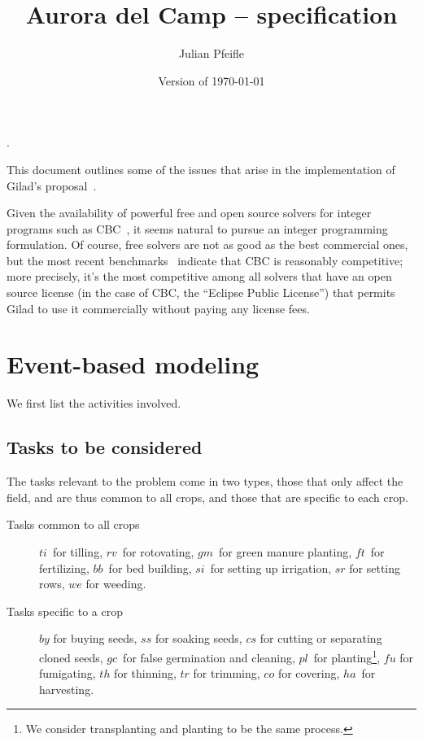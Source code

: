 \documentclass[11pt]{amsart}
\numberwithin{equation}{section}
\begin{document}
\renewcommand*\descriptionlabel[1]{%
\hspace\labelsep\normalfont\itshape #1:}.

\title{Aurora del Camp -- specification}
\author{Julian Pfeifle}
\date{Version of \today}
\maketitle

This document outlines some of the issues that arise in the
implementation of Gilad's proposal~\cite{buzi11}.

\medskip
Given the availability of powerful free and open source solvers for
integer programs such as CBC~\cite{cbc}, it seems natural to pursue an
integer programming formulation. Of course, free solvers are not as
good as the best commercial ones, but the most recent
benchmarks~\cite{mittelmann11} indicate that CBC is reasonably
competitive; more precisely, it's the most competitive among all
solvers that have an open source license (in the case of CBC, the
``Eclipse Public License'') that permits Gilad to use it commercially
without paying any license fees.

\section{Event-based modeling}

We first list the activities involved.

\subsection{Tasks to be considered}

The tasks relevant to the problem come in two types, those that only
affect the field, and are thus common to all crops, and those that are
specific to each crop.

\begin{description}
\item[Tasks common to all crops]  $ti$~for tilling, $rv$~for
  rotovating, $gm$~for green manure planting, $ft$~for fertilizing,
  $bb$~for bed building, $si$~for setting up irrigation, $sr$ for
  setting rows, $we$ for weeding.

\smallskip
\item[Tasks specific to a crop] $by$ for buying seeds, $ss$ for
  soaking seeds, $cs$ for cutting or separating cloned seeds, $gc$~for
  false germination and cleaning, $pl$~for planting\footnote{We
    consider transplanting and planting to be the same process.},
  $f\!u$ for fumigating, $th$ for thinning, $tr$ for trimming, $co$
  for covering, $ha$~for harvesting.
\end{description}
\end{document}
